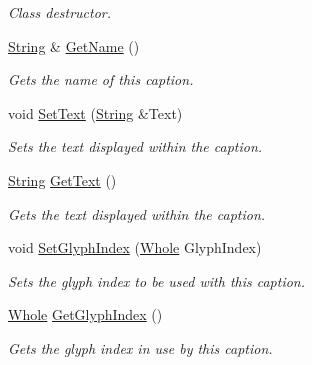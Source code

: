 \begin{DoxyCompactItemize}
\begin{DoxyCompactList}\small\item\em Class destructor. \item\end{DoxyCompactList}\item 
\hyperlink{namespacephys_aa03900411993de7fbfec4789bc1d392e}{String} \& \hyperlink{classphys_1_1UI_1_1Caption_aab80cbb73f9043c9027d64cc18cbc93b}{GetName} ()
\begin{DoxyCompactList}\small\item\em Gets the name of this caption. \item\end{DoxyCompactList}\item 
void \hyperlink{classphys_1_1UI_1_1Caption_afe3774984357de83c7541b0db236b9e7}{SetText} (\hyperlink{namespacephys_aa03900411993de7fbfec4789bc1d392e}{String} \&Text)
\begin{DoxyCompactList}\small\item\em Sets the text displayed within the caption. \item\end{DoxyCompactList}\item 
\hyperlink{namespacephys_aa03900411993de7fbfec4789bc1d392e}{String} \hyperlink{classphys_1_1UI_1_1Caption_ad35be48f6f9df9ca9d9a2e3d0cb99c78}{GetText} ()
\begin{DoxyCompactList}\small\item\em Gets the text displayed within the caption. \item\end{DoxyCompactList}\item 
void \hyperlink{classphys_1_1UI_1_1Caption_ae1730a1af375f858069f63eb05bcb718}{SetGlyphIndex} (\hyperlink{namespacephys_a460f6bc24c8dd347b05e0366ae34f34a}{Whole} GlyphIndex)
\begin{DoxyCompactList}\small\item\em Sets the glyph index to be used with this caption. \item\end{DoxyCompactList}\item 
\hyperlink{namespacephys_a460f6bc24c8dd347b05e0366ae34f34a}{Whole} \hyperlink{classphys_1_1UI_1_1Caption_a4181591a3186ec4d1f87946891a0ef26}{GetGlyphIndex} ()
\begin{DoxyCompactList}\small\item\em Gets the glyph index in use by this caption. \item\end{DoxyCompactList}\item 

\end{DoxyCompactItemize}
